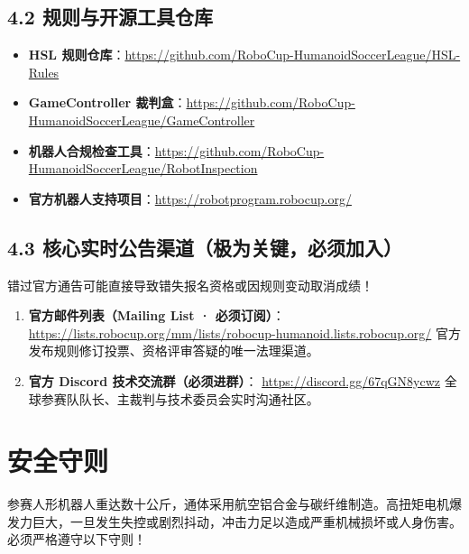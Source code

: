 \documentclass[11pt,a4paper]{ctexart}
\begin{document}
\subsection{4.2 规则与开源工具仓库}
\begin{itemize}[leftmargin=*]
    \item \textbf{HSL 规则仓库}：\url{https://github.com/RoboCup-HumanoidSoccerLeague/HSL-Rules}
    \item \textbf{GameController 裁判盒}：\url{https://github.com/RoboCup-HumanoidSoccerLeague/GameController}
    \item \textbf{机器人合规检查工具}：\url{https://github.com/RoboCup-HumanoidSoccerLeague/RobotInspection}
    \item \textbf{官方机器人支持项目}：\url{https://robotprogram.robocup.org/}
\end{itemize}

\subsection{4.3 核心实时公告渠道（极为关键，必须加入）}
\begin{dangerbox}[核心成员强制要求]
错过官方通告可能直接导致错失报名资格或因规则变动取消成绩！
\end{dangerbox}
\begin{enumerate}
    \item \textbf{官方邮件列表（Mailing List · 必须订阅）}：\newline
    \url{https://lists.robocup.org/mm/lists/robocup-humanoid.lists.robocup.org/} \newline
    官方发布规则修订投票、资格评审答疑的唯一法理渠道。
    \item \textbf{官方 Discord 技术交流群（必须进群）}：\newline
    \url{https://discord.gg/67qGN8ycwz} \newline
    全球参赛队队长、主裁判与技术委员会实时沟通社区。
\end{enumerate}

\newpage
\section{安全守则}

\begin{dangerbox}
参赛人形机器人重达数十公斤，通体采用航空铝合金与碳纤维制造。高扭矩电机爆发力巨大，一旦发生失控或剧烈抖动，冲击力足以造成严重机械损坏或人身伤害。必须严格遵守以下守则！
\end{dangerbox}
\end{document}
